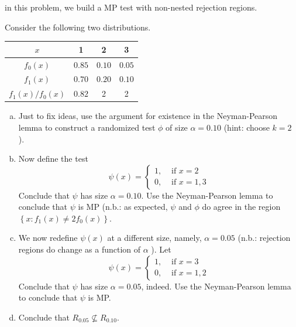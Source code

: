 \begin{ex}
     in this problem, we build a MP test with non-nested rejection regions. 

    Consider the following two distributions. 
    \begin{center}
        \begin{tabular}{cccc}
            \hline\(x\) & 1 & 2 & 3 \\
            \hline\(f_{0}(x)\) & \(0.85\) & \(0.10\) & \(0.05\) \\
            \(f_{1}(x)\) & \(0.70\) & \(0.20\) & \(0.10\) \\
            \hline\(f_{1}(x) / f_{0}(x)\) & \(0.82\) & 2 & 2 \\
            \hline
        \end{tabular}
    \end{center}
    \begin{enumerate}[(a)]
        \item Just to fix ideas, use the argument for existence in the Neyman-Pearson lemma to construct a randomized test \(\phi\) of size \(\alpha=0.10\) (hint: choose \(k=2\) ). 
        \item Now define the test
        \[
            \psi(x)=\left\{\begin{array}{lc}
            1, & \text { if } x=2 \\
            0, & \text { if } x=1,3
            \end{array}\right.
        \]
        Conclude that \(\psi\) has size \(\alpha=0.10\). Use the Neyman-Pearson lemma to conclude that \(\psi\) is MP (n.b.: as expected, \(\psi\) and \(\phi\) do agree in the region \(\left\{x: f_{1}(x) \neq 2 f_{0}(x)\right\}\). 
        \item We now redefine \(\psi(x)\) at a different size, namely, \(\alpha=0.05\) (n.b.: rejection regions do change as a function of \(\alpha\) ). Let
        \[
            \psi(x)=\left\{\begin{array}{lc}
            1, & \text { if } x=3 \\
            0, & \text { if } x=1,2
            \end{array}\right.
        \]
        Conclude that \(\psi\) has size \(\alpha=0.05\), indeed. Use the Neyman-Pearson lemma to conclude that \(\psi\) is MP. 
        \item Conclude that \(R_{0.05} \nsubseteq R_{0.10}\). 
    \end{enumerate}
\end{ex}

